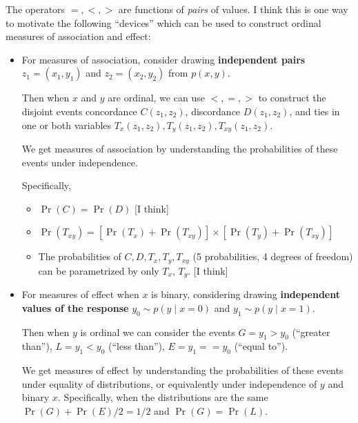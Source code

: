 \documentclass[
  11pt,
  fleqn
]{article}
\begin{document}
The operators $=, <, >$ are
functions of \emph{pairs} of values. I think this is
one way to motivate the
following ``devices'' which can be used to construct ordinal measures of
association and
effect:
\begin{itemize}
  \item For measures of association, consider drawing
    \textbf{independent pairs} $z_1 = (x_1, y_1)$ and $z_2 = (x_2, y_2)$
    from $p(x, y)$.

    Then when $x$ and $y$ are ordinal, we can use $<, =, >$ to
    construct the disjoint events
    concordance $C(z_1, z_2)$, discordance $D(z_1, z_2)$, and ties
    in one or both
    variables $T_x(z_1, z_2), T_y(z_1, z_2), T_{xy}(z_1, z_2)$.

    We get measures of association by understanding the probabilities
    of these events under independence.

    Specifically,
    \begin{itemize}
      \item $\Pr(C) = \Pr(D)$ [I think]
      \item $\Pr(T_{xy}) = [\Pr(T_x) + \Pr(T_{xy})]\times [\Pr(T_y) +
        \Pr(T_{xy})]$
      \item The probabilities of $C, D, T_x, T_y, T_{xy}$ (5
          probabilities, 4 degrees
        of freedom) can be
        parametrized by only $T_x$, $T_y$. [I think]
    \end{itemize}

  \item For measures of effect when $x$ is binary, considering drawing
    \textbf{independent values of the response} $y_0
    \sim p(y \mid x = 0)$ and $y_1 \sim p(y \mid x = 1)$.

    Then when $y$ is ordinal we can consider the events $G = y_1 >
    y_0$ (``greater than''), $L = y_1 < y_0$ (``less than''), $E =
    y_1 == y_0$ (``equal to'').

    We get measures of effect by understanding the probabilities of these events
    under equality of distributions, or equivalently under
    independence of $y$ and binary $x$. Specifically, when the
    distributions are the same $\Pr(G) + \Pr(E)/2 = 1/2$
    and $\Pr(G) = \Pr(L)$.

\end{itemize}
\end{document}
